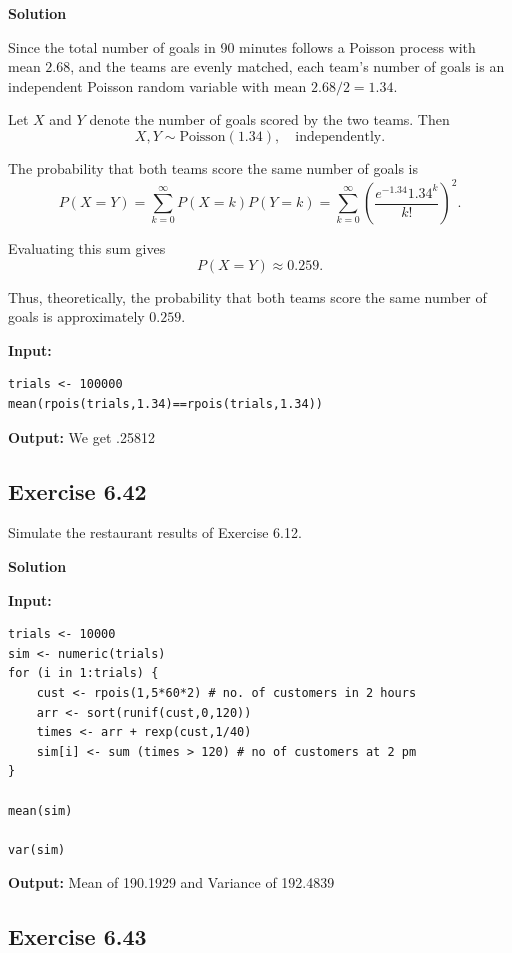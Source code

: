 \documentclass[hidelinks]{article}
\begin{document}
\noindent \textbf{Solution}

\noindent Since the total number of goals in 90 minutes follows a Poisson process 
with mean $2.68$, and the teams are evenly matched, each team’s number 
of goals is an independent Poisson random variable with mean $2.68/2 = 1.34$.

\noindent Let $X$ and $Y$ denote the number of goals scored by the two teams. Then
\[
X, Y \sim \text{Poisson}(1.34),
\quad \text{independently}.
\]

\noindent The probability that both teams score the same number of goals is
\[
P(X = Y)
=
\sum_{k=0}^{\infty}
P(X = k) P(Y = k)
=
\sum_{k=0}^{\infty}
\left(
\frac{e^{-1.34} 1.34^k}{k!}
\right)^2.
\]

\noindent Evaluating this sum gives
\[
P(X = Y) \approx 0.259.
\]

\noindent Thus, theoretically, the probability that both teams score the same 
number of goals is approximately $0.259$.

\noindent \textbf{Input:}

\begin{lstlisting}[caption={Poisson Soccer Simulation}]
trials <- 100000
mean(rpois(trials,1.34)==rpois(trials,1.34))
\end{lstlisting}

\noindent \textbf{Output:} We get .25812

\noindent \subsection{Exercise 6.42}
Simulate the restaurant results of Exercise 6.12.

\noindent \textbf{Solution}

\noindent \textbf{Input:}

\begin{lstlisting}[caption={South Carolina Swamp Forest}]
trials <- 10000
sim <- numeric(trials)
for (i in 1:trials) {
    cust <- rpois(1,5*60*2) # no. of customers in 2 hours
    arr <- sort(runif(cust,0,120))
    times <- arr + rexp(cust,1/40)
    sim[i] <- sum (times > 120) # no of customers at 2 pm
}

mean(sim)

var(sim)
\end{lstlisting}

\noindent \textbf{Output:} Mean of 190.1929 and Variance of 192.4839

\subsection{Exercise 6.43}
\end{document}

